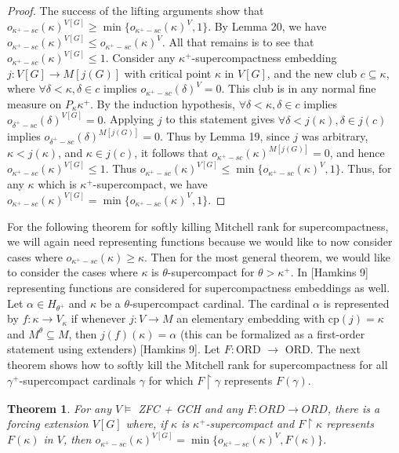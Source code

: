 \documentclass[10pt,leqno]{amsart}
\newtheorem{theorem}{Theorem}[]
\begin{document}
\begin{proof}
The success of the lifting arguments show that $o_{\kappa^+-sc}(\kappa)^{V[G]} \ge \min\{o_{\kappa^+-sc}(\kappa)^V, 1\}$. By Lemma 20, we have $o_{\kappa^+-sc}(\kappa)^{V[G]} \le o_{\kappa^+-sc}(\kappa)^V$. All that remains is to see that $o_{\kappa^+-sc}(\kappa)^{V[G]} \le 1$. Consider any $\kappa^+$-supercompactness embedding $j:V[G] \to M[j(G)]$ with critical point $\kappa$ in $V[G]$, and the new club $c \subseteq \kappa$, where $\forall \delta < \kappa, \delta \in c$ implies $o_{\kappa^+-sc}(\delta)^V = 0$. This club is in any normal fine measure on $P_{\kappa}\kappa^+$. By the induction hypothesis, $\forall \delta < \kappa, \delta \in c$ implies $o_{\delta^+-sc}(\delta)^{V[G]} = 0$. Applying $j$ to this statement gives $\forall \delta < j(\kappa), \delta \in j(c)$ implies $o_{\delta^+-sc}(\delta)^{M[j(G)]} = 0$. Thus by Lemma 19, since $j$ was arbitrary, $\kappa < j(\kappa)$, and $\kappa \in j(c)$, it follows that $o_{\kappa^+-sc}(\kappa)^{M[j(G)]} = 0$, and hence $o_{\kappa^+-sc}(\kappa)^{V[G]} \le 1$. Thus $o_{\kappa^+-sc}(\kappa)^{V[G]} \le \min\{o_{\kappa^+-sc}(\kappa)^V, 1\}$. Thus, for any $\kappa$ which is $\kappa^+$-supercompact, we have $o_{\kappa^+-sc}(\kappa)^{V[G]} = \min\{o_{\kappa^+-sc}(\kappa)^V,1\}$.
\end{proof}

For the following theorem for softly killing Mitchell rank for supercompactness, we will again need representing functions because we would like to now consider cases where $o_{\kappa^+-sc}(\kappa) \ge \kappa$. Then for the most general theorem, we would like to consider the cases where $\kappa$ is $\theta$-supercompact for $\theta > \kappa^+$. In [Hamkins 9] representing functions are considered for supercompactness embeddings as well. Let $\alpha \in H_{\theta^+}$ and $\kappa$ be a $\theta$-supercompact cardinal. The cardinal $\alpha$ is represented by $f: \kappa \to V_{\kappa}$ if whenever $j: V \to M$ an elementary embedding with cp$(j) = \kappa$ and $M^{\theta} \subseteq M$, then $j(f)(\kappa) = \alpha$ (this can be formalized as a first-order statement using extenders) [Hamkins 9]. Let $F:$ORD $\to$ ORD. The next theorem shows how to softly kill the Mitchell rank for supercompactness for all $\gamma^+$-supercompact cardinals $\gamma$ for which $F \upharpoonright \gamma$ represents $F(\gamma)$.

\begin{theorem} For any $V \models$ ZFC + GCH and any $F: ORD \to ORD$, there is a forcing extension $V[G]$ where, if $\kappa$ is $\kappa^+$-supercompact and $F \upharpoonright \kappa$ represents $F(\kappa)$ in $V$, then $o_{\kappa^+-sc}(\kappa)^{V[G]} = \min\{o_{\kappa^+-sc}(\kappa)^V, F(\kappa)\}$.
\end{theorem}
\end{document}

